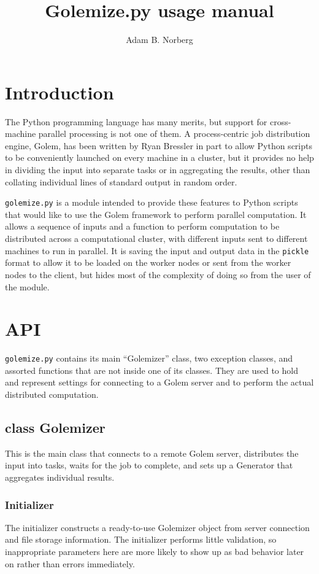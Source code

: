 \documentclass[11pt,ebook,oneside,final]{memoir} %
\title{Golemize.py usage manual}
\author{Adam B. Norberg}
\begin{document}
\maketitle
\tableofcontents* %

\chapter{Introduction}
The Python programming language has many merits, but support for cross-machine parallel processing is not one of them. A process-centric job distribution engine, Golem, has been written by Ryan Bressler in part to allow Python scripts to be conveniently launched on every machine in a cluster, but it provides no help in dividing the input into separate tasks or in aggregating the results, other than collating individual lines of standard output in random order.

\texttt{golemize.py} is a module intended to provide these features to Python scripts that would like to use the Golem framework to perform parallel computation. It allows a sequence of inputs and a function to perform computation to be distributed across a computational cluster, with different inputs sent to different machines to run in parallel. It is saving the input and output data in the \texttt{pickle} format to allow it to be loaded on the worker nodes or sent from the worker nodes to the client, but hides most of the complexity of doing so from the user of the module.
\chapter{API}
\texttt{golemize.py} contains its main ``Golemizer'' class, two exception classes, and assorted functions that are not inside one of its classes. They are used to hold and represent settings for connecting to a Golem server and to perform the actual distributed computation.

\section{class Golemizer}
This is the main class that connects to a remote Golem server, distributes the input into tasks, waits for the job to complete, and sets up a Generator that aggregates individual results.

\subsection{Initializer}
The initializer constructs a ready-to-use Golemizer object from server connection and file storage information. The initializer performs little validation, so inappropriate parameters here are more likely to show up as bad behavior later on rather than errors immediately.
\end{document}
